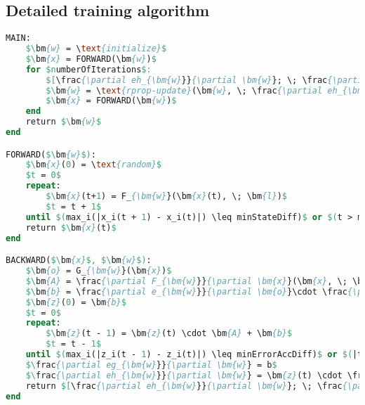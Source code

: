 \documentclass[]{spie}  %
\newcommand{\bm}[1]{\boldsymbol{#1}}
\begin{document}
\subsection{Detailed training algorithm}
\begin{lstlisting}[mathescape, style=outcode, language=pascal, caption=The learning algorithm]
MAIN:
	$\bm{w} = \text{initialize}$
	$\bm{x} = FORWARD(\bm{w})$
	for $numberOfIterations$:
		$[\frac{\partial eh_{\bm{w}}}{\partial \bm{w}}; \; \frac{\partial eg_{\bm{w}}}{\partial \bm{w}}] = BACKWARD(\bm{x}, \; \bm{w})$
		$\bm{w} = \text{rprop-update}(\bm{w}, \; \frac{\partial eh_{\bm{w}}}{\partial \bm{w}}, \; \frac{\partial eg_{\bm{w}}}{\partial \bm{w}})$
		$\bm{x} = FORWARD(\bm{w})$
	end
	return $\bm{w}$
end

FORWARD($\bm{w}$):
	$\bm{x}(0) = \text{random}$
	$t = 0$
	repeat:
		$\bm{x}(t+1) = F_{\bm{w}}(\bm{x}(t), \; \bm{l})$
		$t = t + 1$
	until $(max_i(|x_i(t + 1) - x_i(t)|) \leq minStateDiff)$ or $(t > maxForwardSteps)$
	return $\bm{x}(t)$
end

BACKWARD($\bm{x}$, $\bm{w}$):
	$\bm{o} = G_{\bm{w}}(\bm{x})$
	$\bm{A} = \frac{\partial F_{\bm{w}}}{\partial \bm{x}}(\bm{x}, \; \bm{l})$
	$\bm{b} = \frac{\partial e_{\bm{w}}}{\partial \bm{o}}\cdot \frac{\partial G_{\bm{w}}}{\partial x}(\bm{x})$
	$\bm{z}(0) = \bm{b}$
	$t = 0$
	repeat:
		$\bm{z}(t - 1) = \bm{z}(t) \cdot \bm{A} + \bm{b}$
		$t = t - 1$
	until $(max_i(|z_i(t - 1) - z_i(t)|) \leq minErrorAccDiff)$ or $(|t| > maxBackwardSteps)$
	$\frac{\partial eg_{\bm{w}}}{\partial \bm{w}} = b$
	$\frac{\partial eh_{\bm{w}}}{\partial \bm{w}} = \bm{z}(t) \cdot \frac{\partial F_{\bm{w}}}{\partial \bm{w}}(\bm{x}, \bm{l}) + \frac{\partial p_{\bm{w}}}{\partial \bm{w}}$
	return $[\frac{\partial eh_{\bm{w}}}{\partial \bm{w}}; \; \frac{\partial eg_{\bm{w}}}{\partial \bm{w}}]$
end
\end{lstlisting}
\end{document}
